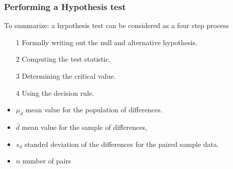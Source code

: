 \documentclass[]{report}
\begin{document}









\subsubsection{Performing a Hypothesis test}
To summarize: a hypothesis test can be considered as a four step process
\begin{itemize}
\item[1] Formally writing out the null and alternative hypothesis.
\item[2] Computing the test statistic.
\item[3] Determining the critical value.
\item[4] Using the decision rule.
\end{itemize}












{
\begin{itemize}
\item $\mu_d$ mean value for the population of differences.
\item $\bar{d}$ mean value for the sample of differences,
\item $s_d$ standrd deviation of the differences for the paired sample data.
\item $n$ number of pairs
\end{itemize}


}

\end{document}
